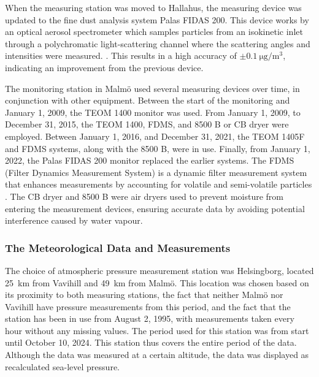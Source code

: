 When the measuring station was moved to Hallahus, the measuring device was updated to the fine dust analysis system Palas FIDAS 200. This device works by an optical aerosol spectrometer which samples particles from an isokinetic inlet through a polychromatic light-scattering channel where the scattering angles and intensities were measured. \cite{palasgmbhOperatingManualFidas}. This results in a high accuracy of $\pm\SI{0.1}{\micro\gram\per\meter\cubed}$, indicating an improvement from the previous device. 

The monitoring station in Malmö used several measuring devices over time, in conjunction with other equipment. Between the start of the monitoring and January 1, 2009, the TEOM 1400 monitor was used. From January 1, 2009, to December 31, 2015, the TEOM 1400, FDMS, and 8500 B or CB dryer were employed. Between January 1, 2016, and December 31, 2021, the TEOM 1405F and FDMS systems, along with the 8500 B, were in use. Finally, from January 1, 2022, the Palas FIDAS 200 monitor replaced the earlier systems. The FDMS (Filter Dynamics Measurement System) is a dynamic filter measurement system that enhances measurements by accounting for volatile and semi-volatile particles \cite{thermoscientific8500FDMSFilter2010}. The CB dryer and 8500 B were air dryers used to prevent moisture from entering the measurement devices, ensuring accurate data by avoiding potential interference caused by water vapour.

\subsubsection{The Meteorological Data and Measurements}
The choice of atmospheric pressure measurement station was Helsingborg, located \SI{25}{\km} from Vavihill and \SI{49}{\km} from Malmö. This location was chosen based on its proximity to both \PM measuring stations, the fact that neither Malmö nor Vavihill have pressure measurements from this period, and the fact that the station has been in use from August 2, 1995, with measurements taken every hour without any missing values. The period used for this station was from start until October 10, 2024. This station thus covers the entire period of the \PM data. Although the data was measured at a certain altitude, the data was displayed as recalculated sea-level pressure.

